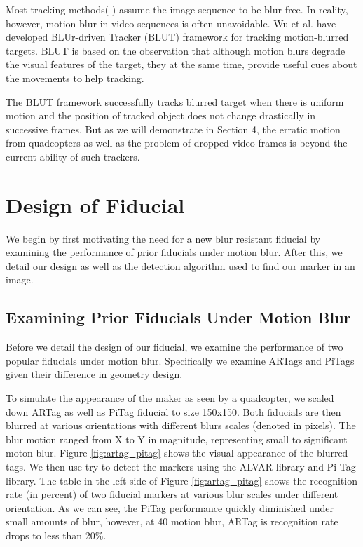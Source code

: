 \documentclass[runningheads]{llncs}
\begin{document}
Most tracking methods( \cite{Ross:2008,Wu:2009,Perez02}
\cite{Mei:2009} ) assume the image sequence to be blur free. In reality, however,
motion blur in video sequences is often unavoidable. Wu et al.\cite{Wu:2011} have
developed BLUr-driven Tracker (BLUT) framework for tracking motion-blurred
targets. BLUT is based on the observation that although motion blurs degrade
the visual features of the target, they at the same time, provide useful cues
about the movements to help tracking.

The BLUT framework successfully tracks blurred target when there is uniform motion
and the position of tracked object does not change drastically in successive
frames. But as we will demonstrate in Section 4, the erratic motion from quadcopters as 
well as the problem of dropped video frames is beyond the current ability of such trackers.

\section{Design of Fiducial}

We begin by first motivating the need for a new blur resistant fiducial by examining
the performance of prior fiducials under motion blur.  After this, we detail
our design as well as the detection algorithm used to find our marker in an image.

\subsection{Examining Prior Fiducials Under Motion Blur}

Before we detail the design of our fiducial, we examine the performance of two
popular fiducials under motion blur.  Specifically we examine ARTags\cite{Fiala05} and PiTags\cite{Pitag13} given their difference in geometry design.

To simulate the appearance of the maker as seen by a quadcopter, 
we scaled down ARTag as well as PiTag fiducial to size 150x150. 
 Both fiducials are then blurred at various orientations with different blurs scales
(denoted in pixels).   The blur motion ranged from X to Y in magnitude, representing
small to significant moton blur.   Figure \ref{fig:artag_pitag} shows the visual appearance
of the blurred tags.   We then use try to detect the markers using the 
ALVAR library\cite{alvar} and Pi-Tag library\cite{ros_pitag}.
The table in the left side of Figure
\ref{fig:artag_pitag} shows the recognition rate (in percent) of two fiducial
markers at various blur scales under different orientation.   As we can see, the PiTag performance quickly diminished under small amounts of blur, however, at 40 motion blur, ARTag is recognition rate drops to less than 20\%. 
\end{document}
